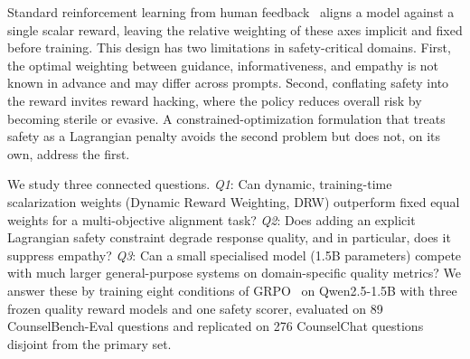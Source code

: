 \documentclass[10pt,twocolumn]{article}
\begin{document}
Standard reinforcement learning from human feedback~\citep{ouyang2022rlhf, bai2022hh} aligns a model against a single scalar reward, leaving the relative weighting of these axes implicit and fixed before training. This design has two limitations in safety-critical domains. First, the optimal weighting between guidance, informativeness, and empathy is not known in advance and may differ across prompts. Second, conflating safety into the reward invites reward hacking, where the policy reduces overall risk by becoming sterile or evasive. A constrained-optimization formulation that treats safety as a Lagrangian penalty avoids the second problem but does not, on its own, address the first.

We study three connected questions. \emph{Q1}: Can dynamic, training-time scalarization weights (Dynamic Reward Weighting, DRW) outperform fixed equal weights for a multi-objective alignment task? \emph{Q2}: Does adding an explicit Lagrangian safety constraint degrade response quality, and in particular, does it suppress empathy? \emph{Q3}: Can a small specialised model (1.5B parameters) compete with much larger general-purpose systems on domain-specific quality metrics? We answer these by training eight conditions of GRPO~\citep{shao2024grpo} on Qwen2.5-1.5B with three frozen quality reward models and one safety scorer, evaluated on 89 CounselBench-Eval questions and replicated on 276 CounselChat questions disjoint from the primary set.
\end{document}
